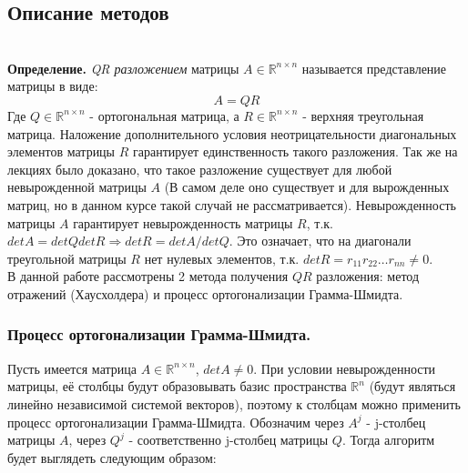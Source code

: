 \documentclass[a4paper,12pt,titlepage,final]{article}
\begin{document}
\subsection{Описание методов}\\
\textbf{Определение.} \textit{QR разложением} матрицы $A \in \mathbb{R}^{n \times n}$ называется представление матрицы в виде: $$A = QR$$
Где $Q \in \mathbb{R}^{n \times n}$ - ортогональная матрица, а $R \in \mathbb{R}^{n \times n}$ - верхняя треугольная матрица. Наложение дополнительного условия неотрицательности диагональных элементов матрицы $R$ гарантирует единственность такого разложения. Так же на лекциях было доказано, что такое разложение существует для любой невырожденной матрицы $A$ (В самом деле оно существует и для вырожденных матриц, но в данном курсе такой случай не рассматривается). Невырожденность матрицы $A$ гарантирует невырожденность матрицы $R$, т.к. $detA = detQ detR \Rightarrow detR = detA / detQ$. Это означает, что на диагонали треугольной матрицы $R$ нет нулевых элементов, т.к. $detR = r_{11}r_{22}\ldots r_{nn} \neq 0$. \\
В данной работе рассмотрены 2 метода получения $QR$ разложения: метод отражений (Хаусхолдера) и процесс ортогонализации Грамма-Шмидта.
\subsubsection{Процесс ортогонализации Грамма-Шмидта.}
Пусть имеется матрица $A \in \mathbb{R}^{n \times n}$, $detA \neq 0$. При условии невырожденности матрицы, её столбцы будут образовывать базис пространства $\mathbb{R}^n$ (будут являться линейно независимой системой векторов), поэтому к столбцам можно применить процесс ортогонализации Грамма-Шмидта. Обозначим через $A^j$ - j-столбец матрицы $A$, через $Q^j$ - соответственно j-столбец матрицы $Q$. Тогда алгоритм будет выглядеть следующим образом:
\end{document}
